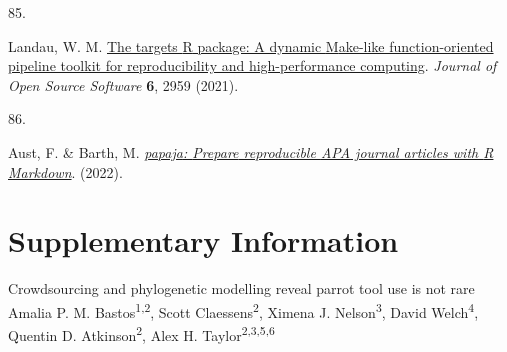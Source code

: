 \documentclass[
  man,floatsintext]{apa6}
\newlength{\cslhangindent}
\newlength{\csllabelwidth}
\newlength{\cslentryspacingunit} %
\newenvironment{CSLReferences}[2] %
 {%
  \setlength{\parindent}{0pt}
  \ifodd #1
  \let\oldpar\par
  \def\par{\hangindent=\cslhangindent\oldpar}
  \fi
  \setlength{\parskip}{#2\cslentryspacingunit}
 }%
 {}
\newcommand{\CSLLeftMargin}[1]{\parbox[t]{\csllabelwidth}{#1}}
\newcommand{\CSLRightInline}[1]{\parbox[t]{\linewidth - \csllabelwidth}{#1}\break}
\begin{document}
\begin{CSLReferences}{0}{0}
\leavevmode{}%
\CSLLeftMargin{85. }%
\CSLRightInline{Landau, W. M. \href{https://doi.org/10.21105/joss.02959}{The targets {R} package: A dynamic {M}ake-like function-oriented pipeline toolkit for reproducibility and high-performance computing}. \emph{Journal of Open Source Software} \textbf{6}, 2959 (2021).}

\leavevmode{}%
\CSLLeftMargin{86. }%
\CSLRightInline{Aust, F. \& Barth, M. \emph{\href{https://github.com/crsh/papaja}{{papaja}: {Prepare} reproducible {APA} journal articles with {R Markdown}}}. (2022).}

\end{CSLReferences}

\endgroup

\newpage
\vspace*{60mm}

\renewcommand{\figurename}{Supplementary Figure}
\renewcommand{\tablename}{Supplementary Table}
\renewcommand{\thefigure}{\arabic{figure}} \setcounter{figure}{0}
\renewcommand{\thetable}{\arabic{table}} \setcounter{table}{0}
\renewcommand{\theequation}{S\arabic{equation}} \setcounter{equation}{0}

\hypertarget{supplementary-information}{%
\section{\texorpdfstring{\textbf{Supplementary Information}}{Supplementary Information}}\label{supplementary-information}}

\setcounter{page}{1}
\centering

\noindent \hspace*{5mm} \small Crowdsourcing and phylogenetic modelling reveal parrot tool use is not rare \newline
\hspace*{1cm} \small Amalia P. M. Bastos\textsuperscript{1,2}, Scott Claessens\textsuperscript{2}, Ximena J. Nelson\textsuperscript{3}, David Welch\textsuperscript{4}, \newline
\hspace*{25mm} Quentin D. Atkinson\textsuperscript{2}, Alex H. Taylor\textsuperscript{2,3,5,6} \newline

\raggedright
\end{document}
